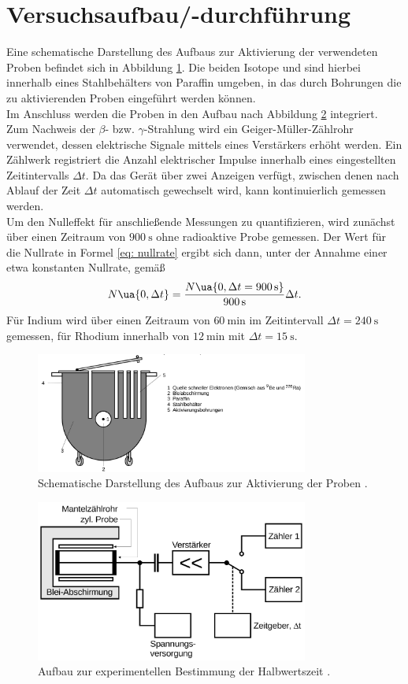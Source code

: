 \section{Versuchsaufbau/-durchführung}
Eine schematische Darstellung des Aufbaus zur Aktivierung der verwendeten Proben befindet sich in Abbildung \ref{fig: neutronenquelle}.
Die beiden Isotope  und  sind hierbei innerhalb eines Stahlbehälters von Paraffin umgeben, in das durch Bohrungen
die zu aktivierenden Proben eingeführt werden können.\\
Im Anschluss werden die Proben in den Aufbau nach Abbildung \ref{fig: aufbau} integriert.
Zum Nachweis der $\beta$- bzw. $\gamma$-Strahlung wird ein Geiger-Müller-Zählrohr verwendet, dessen elektrische Signale
mittels eines Verstärkers erhöht werden. Ein Zählwerk registriert die Anzahl elektrischer Impulse innerhalb eines eingestellten
Zeitintervalls $\Delta t$. Da das Gerät über zwei Anzeigen verfügt, zwischen denen nach Ablauf der Zeit $\Delta t$ automatisch gewechselt
wird, kann kontinuierlich gemessen werden. \\
Um den Nulleffekt für anschließende Messungen zu quantifizieren, wird zunächst
über einen Zeitraum von $\SI{900}{\second}$ ohne radioaktive Probe gemessen. Der Wert für die Nullrate in Formel \eqref{eq: nullrate}
ergibt sich dann, unter der Annahme einer etwa konstanten Nullrate, gemäß
\begin{equation}
  N\ua{0,\Delta t} = \frac{N\ua{0, \Delta t = \SI{900}{\second}}}{ \SI{900}{\second}} \Delta t.
\end{equation}
Für Indium wird über einen Zeitraum von $\SI{60}{\minute}$ im Zeitintervall $\Delta t = \SI{240}{\second}$ gemessen,
für Rhodium innerhalb von $\SI{12}{\minute}$ mit $\Delta t = \SI{15}{\second}$.
\begin{figure}
  \centering
  \includegraphics[width=0.8\textwidth]{pics/aufbau.png}
  \caption{Schematische Darstellung des Aufbaus zur Aktivierung der Proben \cite{anleitung702}.}
  \label{fig: neutronenquelle}
  \end{figure}
\begin{figure}
\centering
\includegraphics[width=0.8\textwidth]{pics/aufbau_2.png}
\caption{Aufbau zur experimentellen Bestimmung der Halbwertszeit \cite{anleitung702}.}
\label{fig: aufbau}
\end{figure}
